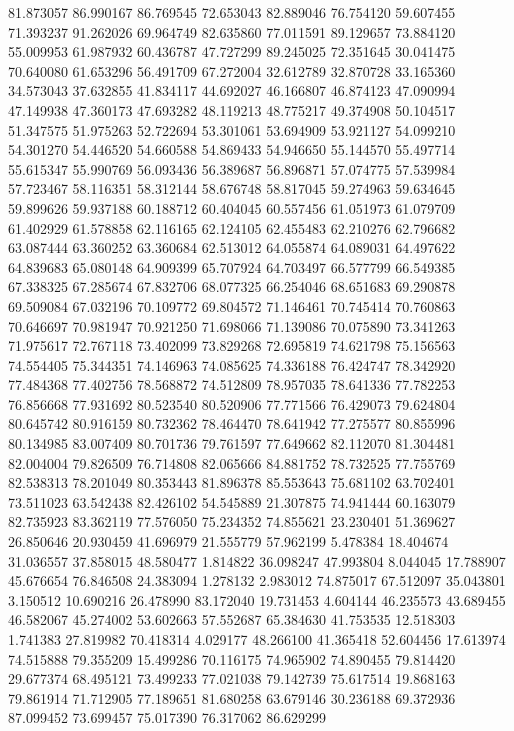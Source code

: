 81.873057
86.990167
86.769545
72.653043
82.889046
76.754120
59.607455
71.393237
91.262026
69.964749
82.635860
77.011591
89.129657
73.884120
55.009953
61.987932
60.436787
47.727299
89.245025
72.351645
30.041475
70.640080
61.653296
56.491709
67.272004
32.612789
32.870728
33.165360
34.573043
37.632855
41.834117
44.692027
46.166807
46.874123
47.090994
47.149938
47.360173
47.693282
48.119213
48.775217
49.374908
50.104517
51.347575
51.975263
52.722694
53.301061
53.694909
53.921127
54.099210
54.301270
54.446520
54.660588
54.869433
54.946650
55.144570
55.497714
55.615347
55.990769
56.093436
56.389687
56.896871
57.074775
57.539984
57.723467
58.116351
58.312144
58.676748
58.817045
59.274963
59.634645
59.899626
59.937188
60.188712
60.404045
60.557456
61.051973
61.079709
61.402929
61.578858
62.116165
62.124105
62.455483
62.210276
62.796682
63.087444
63.360252
63.360684
62.513012
64.055874
64.089031
64.497622
64.839683
65.080148
64.909399
65.707924
64.703497
66.577799
66.549385
67.338325
67.285674
67.832706
68.077325
66.254046
68.651683
69.290878
69.509084
67.032196
70.109772
69.804572
71.146461
70.745414
70.760863
70.646697
70.981947
70.921250
71.698066
71.139086
70.075890
73.341263
71.975617
72.767118
73.402099
73.829268
72.695819
74.621798
75.156563
74.554405
75.344351
74.146963
74.085625
74.336188
76.424747
78.342920
77.484368
77.402756
78.568872
74.512809
78.957035
78.641336
77.782253
76.856668
77.931692
80.523540
80.520906
77.771566
76.429073
79.624804
80.645742
80.916159
80.732362
78.464470
78.641942
77.275577
80.855996
80.134985
83.007409
80.701736
79.761597
77.649662
82.112070
81.304481
82.004004
79.826509
76.714808
82.065666
84.881752
78.732525
77.755769
82.538313
78.201049
80.353443
81.896378
85.553643
75.681102
63.702401
73.511023
63.542438
82.426102
54.545889
21.307875
74.941444
60.163079
82.735923
83.362119
77.576050
75.234352
74.855621
23.230401
51.369627
26.850646
20.930459
41.696979
21.555779
57.962199
5.478384
18.404674
31.036557
37.858015
48.580477
1.814822
36.098247
47.993804
8.044045
17.788907
45.676654
76.846508
24.383094
1.278132
2.983012
74.875017
67.512097
35.043801
3.150512
10.690216
26.478990
83.172040
19.731453
4.604144
46.235573
43.689455
46.582067
45.274002
53.602663
57.552687
65.384630
41.753535
12.518303
1.741383
27.819982
70.418314
4.029177
48.266100
41.365418
52.604456
17.613974
74.515888
79.355209
15.499286
70.116175
74.965902
74.890455
79.814420
29.677374
68.495121
73.499233
77.021038
79.142739
75.617514
19.868163
79.861914
71.712905
77.189651
81.680258
63.679146
30.236188
69.372936
87.099452
73.699457
75.017390
76.317062
86.629299
